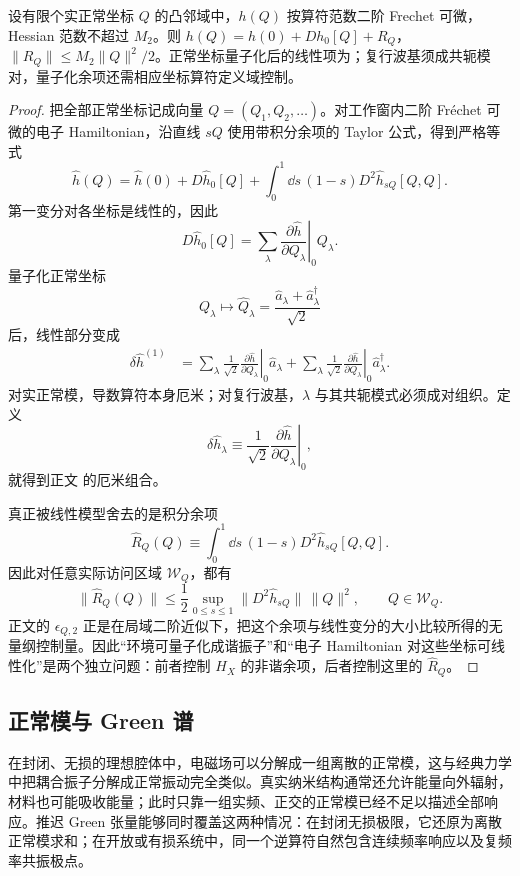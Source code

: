\begin{proposition}
设有限个实正常坐标 $Q$ 的凸邻域中，$h(Q)$ 按算符范数二阶 Frechet 可微，Hessian 范数不超过 $M_2$。则 $h(Q)=h(0)+Dh_0[Q]+R_Q$，$\|R_Q\|\le M_2\|Q\|^2/2$。正常坐标量子化后的线性项为；复行波基须成共轭模对，量子化余项还需相应坐标算符定义域控制。
\end{proposition}
\begin{proof}
把全部正常坐标记成向量 $Q=(Q_1,Q_2,\ldots)$。对工作窗内二阶 Fr\'echet 可微的电子 Hamiltonian，沿直线 $sQ$ 使用带积分余项的 Taylor 公式，得到严格等式
\[
\hat h(Q)
=\hat h(0)
+D\hat h_0[Q]
+\int_0^1\dd s\,(1-s)
D^2\hat h_{sQ}[Q,Q].
\]
第一变分对各坐标是线性的，因此
\[
D\hat h_0[Q]
=\sum_\lambda
\left.\frac{\partial\hat h}{\partial Q_\lambda}\right|_0 Q_\lambda.
\]
量子化正常坐标
\[
Q_\lambda\longmapsto
\hat Q_\lambda
=\frac{\hat a_\lambda+\hat a_\lambda^\dagger}{\sqrt2}
\]
后，线性部分变成
\begin{align*}
\delta\hat h^{(1)}
&=\sum_\lambda\frac1{\sqrt2}
\left.\frac{\partial\hat h}{\partial Q_\lambda}\right|_0
\hat a_\lambda
+\sum_\lambda\frac1{\sqrt2}
\left.\frac{\partial\hat h}{\partial Q_\lambda}\right|_0
\hat a_\lambda^\dagger .
\end{align*}
对实正常模，导数算符本身厄米；对复行波基，$\lambda$ 与其共轭模式必须成对组织。定义
\[
\delta\hat h_\lambda
\equiv
\frac1{\sqrt2}
\left.\frac{\partial\hat h}{\partial Q_\lambda}\right|_0,
\]
就得到正文 的厄米组合。

真正被线性模型舍去的是积分余项
\[
\hat R_Q(Q)
\equiv
\int_0^1\dd s\,(1-s)
D^2\hat h_{sQ}[Q,Q].
\]
因此对任意实际访问区域 $\mathcal W_Q$，都有
\[
\|\hat R_Q(Q)\|
\le
\frac12
\sup_{0\le s\le1}
\bigl\|D^2\hat h_{sQ}\bigr\|\,\|Q\|^2,
\qquad Q\in\mathcal W_Q.
\]
正文的 $\epsilon_{Q,2}$ 正是在局域二阶近似下，把这个余项与线性变分的大小比较所得的无量纲控制量。因此“环境可量子化成谐振子”和“电子 Hamiltonian 对这些坐标可线性化”是两个独立问题：前者控制 $H_X$ 的非谐余项，后者控制这里的 $\hat R_Q$。
\end{proof}


\subsection{正常模与 Green 谱}

在封闭、无损的理想腔体中，电磁场可以分解成一组离散的正常模，这与经典力学中把耦合振子分解成正常振动完全类似。真实纳米结构通常还允许能量向外辐射，材料也可能吸收能量；此时只靠一组实频、正交的正常模已经不足以描述全部响应。推迟 Green 张量能够同时覆盖这两种情况：在封闭无损极限，它还原为离散正常模求和；在开放或有损系统中，同一个逆算符自然包含连续频率响应以及复频率共振极点。

